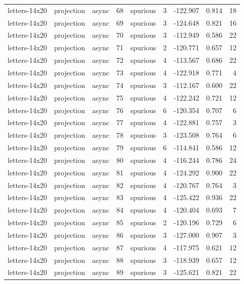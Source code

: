 \begin{tabular}{lllrlrrrr}
letters-14x20 & projection & async & 68 & spurious & 3 & -122.907 & 0.814 & 18 \\
letters-14x20 & projection & async & 69 & spurious & 3 & -124.648 & 0.821 & 16 \\
letters-14x20 & projection & async & 70 & spurious & 3 & -112.949 & 0.586 & 22 \\
letters-14x20 & projection & async & 71 & spurious & 2 & -120.771 & 0.657 & 12 \\
letters-14x20 & projection & async & 72 & spurious & 4 & -113.567 & 0.686 & 22 \\
letters-14x20 & projection & async & 73 & spurious & 4 & -122.918 & 0.771 & 4 \\
letters-14x20 & projection & async & 74 & spurious & 3 & -112.167 & 0.600 & 22 \\
letters-14x20 & projection & async & 75 & spurious & 4 & -122.242 & 0.721 & 12 \\
letters-14x20 & projection & async & 76 & spurious & 6 & -120.354 & 0.707 & 6 \\
letters-14x20 & projection & async & 77 & spurious & 4 & -122.881 & 0.757 & 3 \\
letters-14x20 & projection & async & 78 & spurious & 3 & -123.508 & 0.764 & 6 \\
letters-14x20 & projection & async & 79 & spurious & 6 & -114.841 & 0.586 & 12 \\
letters-14x20 & projection & async & 80 & spurious & 4 & -116.244 & 0.786 & 24 \\
letters-14x20 & projection & async & 81 & spurious & 4 & -124.292 & 0.900 & 22 \\
letters-14x20 & projection & async & 82 & spurious & 4 & -120.767 & 0.764 & 3 \\
letters-14x20 & projection & async & 83 & spurious & 4 & -125.422 & 0.936 & 22 \\
letters-14x20 & projection & async & 84 & spurious & 4 & -120.404 & 0.693 & 7 \\
letters-14x20 & projection & async & 85 & spurious & 2 & -120.196 & 0.729 & 6 \\
letters-14x20 & projection & async & 86 & spurious & 3 & -127.000 & 0.907 & 3 \\
letters-14x20 & projection & async & 87 & spurious & 4 & -117.975 & 0.621 & 12 \\
letters-14x20 & projection & async & 88 & spurious & 3 & -118.939 & 0.657 & 12 \\
letters-14x20 & projection & async & 89 & spurious & 3 & -125.621 & 0.821 & 22 \\

\end{tabular}
